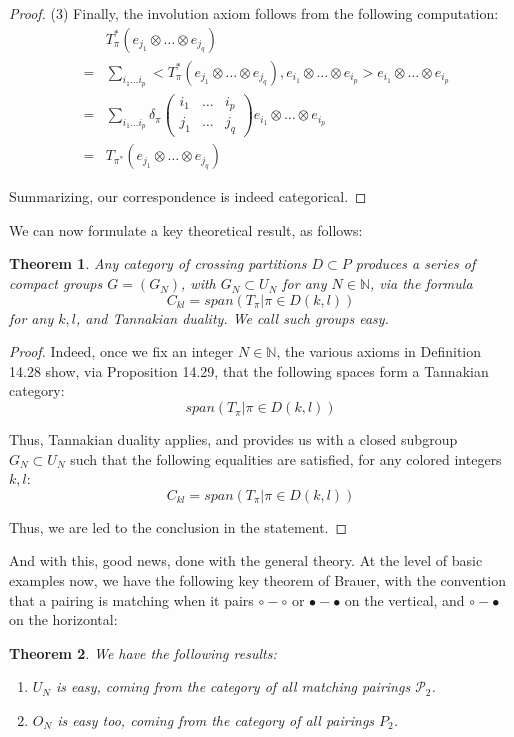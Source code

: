 \documentclass[12pt]{amsbook}
\newtheorem{theorem}{Theorem}[chapter]
\begin{document}
\begin{proof}
(3) Finally, the involution axiom follows from the following computation:
\begin{eqnarray*}
&&T_\pi^*(e_{j_1}\otimes\ldots\otimes e_{j_q})\\
&=&\sum_{i_1\ldots i_p}<T_\pi^*(e_{j_1}\otimes\ldots\otimes e_{j_q}),e_{i_1}\otimes\ldots\otimes e_{i_p}>e_{i_1}\otimes\ldots\otimes e_{i_p}\\
&=&\sum_{i_1\ldots i_p}\delta_\pi\begin{pmatrix}i_1&\ldots&i_p\\ j_1&\ldots& j_q\end{pmatrix}e_{i_1}\otimes\ldots\otimes e_{i_p}\\
&=&T_{\pi^*}(e_{j_1}\otimes\ldots\otimes e_{j_q})
\end{eqnarray*}

Summarizing, our correspondence is indeed categorical.
\end{proof}

We can now formulate a key theoretical result, as follows:

\begin{theorem}
Any category of crossing partitions $D\subset P$ produces a series of compact groups $G=(G_N)$, with $G_N\subset U_N$ for any $N\in\mathbb N$, via the formula
$$C_{kl}=span\left(T_\pi\Big|\pi\in D(k,l)\right)$$
for any $k,l$, and Tannakian duality. We call such groups easy.
\end{theorem}

\begin{proof}
Indeed, once we fix an integer $N\in\mathbb N$, the various axioms in Definition 14.28 show, via Proposition 14.29, that the following spaces form a Tannakian category:
$$span\left(T_\pi\Big|\pi\in D(k,l)\right)$$

Thus, Tannakian duality applies, and provides us with a closed subgroup $G_N\subset U_N$ such that the following equalities are satisfied, for any colored integers $k,l$:
$$C_{kl}=span\left(T_\pi\Big|\pi\in D(k,l)\right)$$

Thus, we are led to the conclusion in the statement.
\end{proof}

And with this, good news, done with the general theory. At the level of basic examples now, we have the following key theorem of Brauer, with the convention that a pairing is matching when it pairs $\circ-\circ$ or $\bullet-\bullet$ on the vertical, and $\circ-\bullet$ on the horizontal: 

\begin{theorem}
We have the following results:
\begin{enumerate}
\item $U_N$ is easy, coming from the category of all matching pairings $\mathcal P_2$.

\item $O_N$ is easy too, coming from the category of all pairings $P_2$.
\end{enumerate}
\end{theorem}
\end{document}
